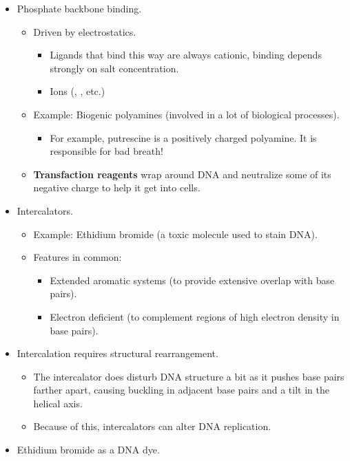 \documentclass[../notes.tex]{subfiles}
\begin{document}
\begin{itemize}
    \item Phosphate backbone binding.
    \begin{itemize}
        \item Driven by electrostatics.
        \begin{itemize}
            \item Ligands that bind this way are always cationic, binding depends strongly on salt concentration.
            \item Ions (, , etc.)
        \end{itemize}
        \item Example: Biogenic polyamines (involved in a lot of biological processes).
        \begin{itemize}
            \item For example, putrescine is a positively charged polyamine. It is responsible for bad breath!
        \end{itemize}
        \item \textbf{Transfaction reagents} wrap around DNA and neutralize some of its negative charge to help it get into cells.
    \end{itemize}
    \item Intercalators.
    \begin{itemize}
        \item Example: Ethidium bromide (a toxic molecule used to stain DNA).
        \item Features in common:
        \begin{itemize}
            \item Extended aromatic systems (to provide extensive overlap with base pairs).
            \item Electron deficient (to complement regions of high electron density in base pairs).
        \end{itemize}
    \end{itemize}
    \item Intercalation requires structural rearrangement.
    \begin{itemize}
        \item The intercalator does disturb DNA structure a bit as it pushes base pairs farther apart, causing buckling in adjacent base pairs and a tilt in the helical axis.
        \item Because of this, intercalators can alter DNA replication.
    \end{itemize}
    \item Ethidium bromide as a DNA dye.

\end{itemize}
\end{document}
